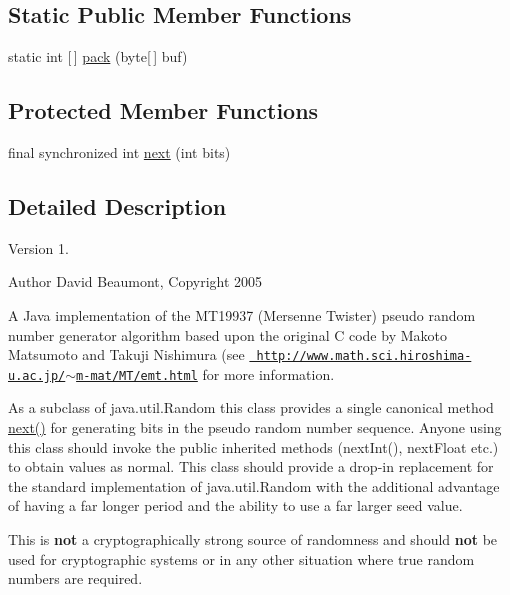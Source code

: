 \subsection*{Static Public Member Functions}
\begin{DoxyCompactItemize}
\item 
static int \mbox{[}$\,$\mbox{]} \mbox{\hyperlink{class_project3_1_1_m_t_random_a072c4515dc4fffe1f96c6bf5d78f5bfc}{pack}} (byte\mbox{[}$\,$\mbox{]} buf)
\end{DoxyCompactItemize}
\subsection*{Protected Member Functions}
\begin{DoxyCompactItemize}
\item 
final synchronized int \mbox{\hyperlink{class_project3_1_1_m_t_random_aa2bb6d5222e59c49548d8f29a9e14be6}{next}} (int bits)
\end{DoxyCompactItemize}


\subsection{Detailed Description}
\begin{DoxyVersion}{Version}
1. 
\end{DoxyVersion}
\begin{DoxyAuthor}{Author}
David Beaumont, Copyright 2005 
\end{DoxyAuthor}
A Java implementation of the M\+T19937 (Mersenne Twister) pseudo random number generator algorithm based upon the original C code by Makoto Matsumoto and Takuji Nishimura (see \href{http://www.math.sci.hiroshima-u.ac.jp/~m-mat/MT/emt.html}{\texttt{ http\+://www.\+math.\+sci.\+hiroshima-\/u.\+ac.\+jp/$\sim$m-\/mat/\+M\+T/emt.\+html}} for more information. 

As a subclass of java.\+util.\+Random this class provides a single canonical method \mbox{\hyperlink{class_project3_1_1_m_t_random_aa2bb6d5222e59c49548d8f29a9e14be6}{next()}} for generating bits in the pseudo random number sequence. Anyone using this class should invoke the public inherited methods (next\+Int(), next\+Float etc.) to obtain values as normal. This class should provide a drop-\/in replacement for the standard implementation of java.\+util.\+Random with the additional advantage of having a far longer period and the ability to use a far larger seed value. 

This is {\bfseries{not}} a cryptographically strong source of randomness and should {\bfseries{not}} be used for cryptographic systems or in any other situation where true random numbers are required. 

